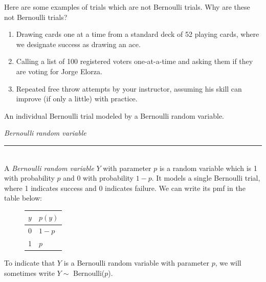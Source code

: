 \documentclass[notes.tex]{subfiles}
\begin{document}
Here are some examples of trials which are not Bernoulli trials. Why are these not Bernoulli trials?
\begin{enumerate}
\item Drawing cards one at a time from a standard deck of 52 playing cards, where we designate success as drawing an ace.
\item Calling a list of 100 registered voters one-at-a-time and asking them if they are voting for Jorge Elorza.
\item Repeated free throw attempts by your instructor, assuming his skill can improve (if only a little) with practice.
\end{enumerate}

An individual Bernoulli trial modeled by a Bernoulli random variable.

\begin{framed}
  \emph{Bernoulli random variable}\\
  \rule{\dimexpr{}\fboxrule}{.1pt} \\
A \emph{Bernoulli random variable} $Y$ with parameter $p$ is a random variable which is 1 with probability $p$ and 0 with probability $1 - p$. It models a single Bernoulli trial, where 1 indicates success and 0 indicates failure. We can write its pmf in the table below:
\begin{figure}[H]
\centering
\begin{tabular}{l@{\hskip 2cm}l}
\toprule
$y$ & $p(y)$\\
\midrule
0 & $1 - p$\\
1 & $p$ \\
\bottomrule
\end{tabular}
\end{figure}
To indicate that $Y$ is a Bernoulli random variable with parameter $p$, we will sometimes write $Y \sim$ Bernoulli($p$).
\end{framed}
\end{document}

